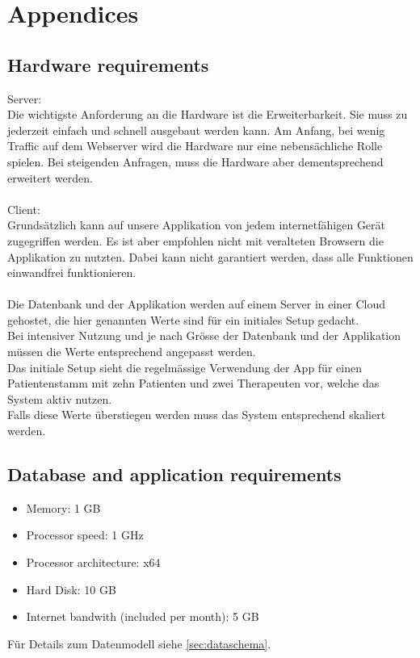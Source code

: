 \chapter{Appendices}

\section{Hardware requirements}
Server: \\
Die wichtigste Anforderung an die Hardware ist die Erweiterbarkeit. Sie muss zu jederzeit einfach und schnell ausgebaut werden kann. Am Anfang, bei wenig Traffic auf dem Webserver wird die Hardware nur eine nebensächliche Rolle spielen. Bei steigenden Anfragen, muss die Hardware aber dementsprechend erweitert werden. \\ \\

Client: \\
Grundsätzlich kann auf unsere Applikation von jedem internetfähigen Gerät zugegriffen werden. Es ist aber empfohlen nicht mit veralteten Browsern die Applikation zu nutzten. Dabei kann nicht garantiert werden, dass alle Funktionen einwandfrei funktionieren. \\ \\

Die Datenbank und der Applikation werden auf einem Server in einer Cloud gehostet, die hier genannten Werte sind für ein initiales Setup gedacht. \\
Bei intensiver Nutzung und je nach Grösse der Datenbank und der Applikation müssen die Werte entsprechend angepasst werden. \\
Das initiale Setup sieht die regelmässige Verwendung der App für einen Patientenstamm mit zehn Patienten und zwei Therapeuten vor, welche das System aktiv nutzen. \\
Falls diese Werte überstiegen werden muss das System entsprechend skaliert werden.

\section{Database and application requirements}

\begin{itemize}
    \item{Memory: 1 GB}
    \item{Processor speed: 1 GHz}
    \item{Processor architecture: x64}
    \item{Hard Disk: 10 GB}
    \item{Internet bandwith (included per month): 5 GB}
\end{itemize}

F\"{u}r Details zum Datenmodell siehe \ref{sec:dataschema}.
